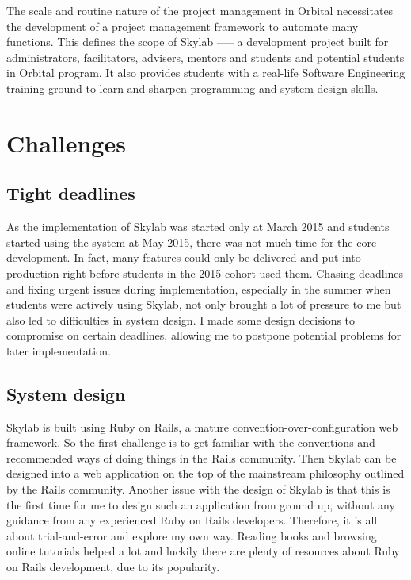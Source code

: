 The scale and routine nature of the project management in Orbital necessitates the development of a project management framework to automate many functions.  This defines the scope of Skylab —-- a development project built for administrators, facilitators, advisers, mentors and students and potential students in Orbital program. It also provides students with a real-life Software Engineering training ground to learn and sharpen programming and system design skills.

\section{Challenges}

\subsection{Tight deadlines}

As the implementation of Skylab was started only at March 2015 and students started using the system at May 2015, there was not much time for the core development. In fact, many features could only be delivered and put into production right before students in the 2015 cohort used them. Chasing deadlines and fixing urgent issues during implementation, especially in the summer when students were actively using Skylab, not only brought a lot of pressure to me but also led to difficulties in system design. I made some design decisions to compromise on certain deadlines, allowing me to postpone potential problems for later implementation.

\subsection{System design}

Skylab is built using Ruby on Rails, a mature convention-over-configuration web framework. So the first challenge is to get familiar with the conventions and recommended ways of doing things in the Rails community. Then Skylab can be designed into a web application on the top of the mainstream philosophy outlined by the Rails community. Another issue with the design of Skylab is that this is the first time for me to design such an application from ground up, without any guidance from any experienced Ruby on Rails developers. Therefore, it is all about trial-and-error and explore my own way. Reading books and browsing online tutorials helped a lot and luckily there are plenty of resources about Ruby on Rails development, due to its popularity.

